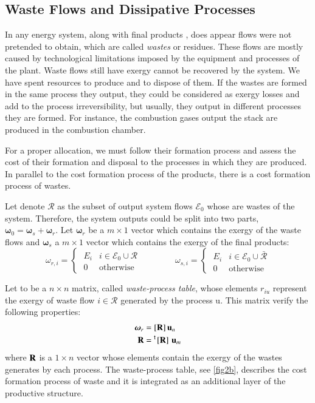 \documentclass{ecos2018}
\begin{document}
\subsection{Waste Flows and Dissipative Processes}
In any energy system, along with final products \cite{Agudelo12}, does appear flows were not pretended to obtain, which are called \emph{wastes} or residues.  These flows are mostly caused by technological limitations imposed by the equipment and processes of the plant.
Waste flows still have exergy cannot be recovered by the system. We have spent resources to produce and to dispose of them. If the wastes are formed in the same process they output, they could be considered as exergy losses and add to the process irreversibility, but usually, they output in different processes they are formed. For instance, the combustion gases output the stack are produced in the combustion chamber.

For a proper allocation, we must follow their formation process and assess the cost of their formation and disposal to the processes in which they are produced. In parallel to the cost formation process of the products, there is a cost formation process of wastes.

Let denote $\mathcal{R}$ as the subset of output system flows $\mathcal{E}_0$ whose are wastes of the system. Therefore, the system outputs could be split into two parts, $\bm{\omega}_0=\bm{\omega}_s+\bm{\omega}_r$.
Let $\bm{\omega}_r$ be a  $m \times 1$ vector which contains the exergy of the waste flows and $\bm{\omega}_s$ a $m \times 1$ vector which contains the exergy of the final products:
\begin{equation}
\omega_{r,i}=\begin{cases}
\;E_i&i\in \mathcal{E}_0\cup\mathcal{R} \\
\;0 & \text{otherwise}
\end{cases}
\qquad \qquad
\omega_{s,i}=\begin{cases}
	\;E_i&i\in \mathcal{E}_0\cup\bar{\mathcal{R}} \\
	\;0 & \text{otherwise}
\end{cases}
\end{equation}

Let  to be a $n \times n$ matrix, called \emph{waste-process table}, whose elements $r_{iu}$ represent the exergy of waste flow $i\in\mathcal{R}$ generated by the process u.
This matrix verify the following properties:
\begin{align}
\bm{\omega}_r &=[\mathbf{R}]\,\mathbf{u}_n \\
\mathbf{R} &=\prescript{\smash{\mathsf{t}}}{}{\mskip-1mu}\left[ \textbf{R} \right]\,\mathbf{u}_m
\end{align}
where $\mathbf{R}$ is a $1\times n$ vector whose elements contain the exergy of the wastes generates by each process. The waste-process table, see \cref{fig2b}, describes the cost formation process of waste and it is integrated as an additional layer of the productive structure.
\end{document}
